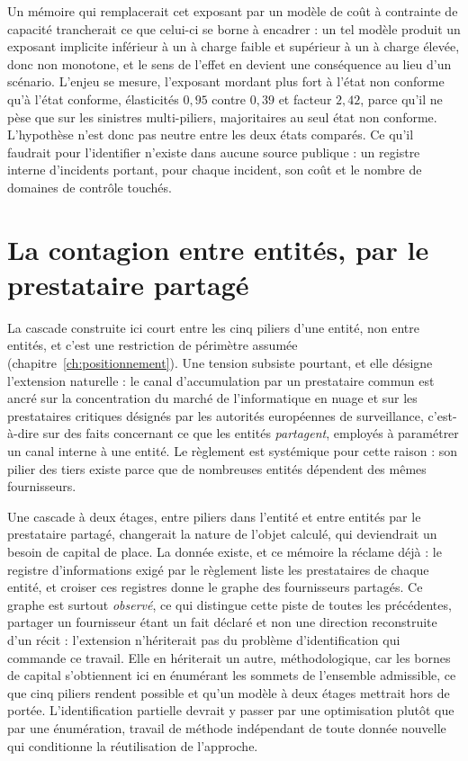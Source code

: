 Un mémoire qui remplacerait cet exposant par un modèle de coût à contrainte de capacité
trancherait ce que celui-ci se borne à encadrer : un tel modèle produit un exposant implicite
inférieur à un à charge faible et supérieur à un à charge élevée, donc non monotone, et le sens de
l'effet en devient une conséquence au lieu d'un scénario. L'enjeu se mesure, l'exposant mordant
plus fort à l'état non conforme qu'à l'état conforme, élasticités $0{,}95$ contre $0{,}39$ et
facteur $2{,}42$, parce qu'il ne pèse que sur les sinistres multi-piliers, majoritaires au seul état
non conforme. L'hypothèse n'est donc pas neutre entre les deux états comparés. Ce qu'il faudrait
pour l'identifier n'existe dans aucune source publique : un registre interne d'incidents portant,
pour chaque incident, son coût et le nombre de domaines de contrôle touchés.


\section{La contagion entre entités, par le prestataire partagé}

La cascade construite ici court entre les cinq piliers d'une entité, non entre entités, et c'est
une restriction de périmètre assumée (chapitre~\ref{ch:positionnement}). Une tension subsiste
pourtant, et elle désigne l'extension naturelle : le canal d'accumulation par un prestataire commun
est ancré sur la concentration du marché de l'informatique en nuage et sur les prestataires
critiques désignés par les autorités européennes de surveillance, c'est-à-dire sur des faits
concernant ce que les entités \emph{partagent}, employés à paramétrer un canal interne à une
entité. Le règlement est systémique pour cette raison : son pilier des tiers existe parce que de
nombreuses entités dépendent des mêmes fournisseurs.

Une cascade à deux étages, entre piliers dans l'entité et entre entités par le prestataire partagé,
changerait la nature de l'objet calculé, qui deviendrait un besoin de capital de place. La donnée
existe, et ce mémoire la réclame déjà : le registre d'informations exigé par le règlement liste les
prestataires de chaque entité, et croiser ces registres donne le graphe des fournisseurs partagés.
Ce graphe est surtout \emph{observé}, ce qui distingue cette piste de toutes les précédentes,
partager un fournisseur étant un fait déclaré et non une direction reconstruite d'un récit :
l'extension n'hériterait pas du problème d'identification qui commande ce travail. Elle en
hériterait un autre, méthodologique, car les bornes de capital s'obtiennent ici en énumérant les
sommets de l'ensemble admissible, ce que cinq piliers rendent possible et qu'un modèle à deux
étages mettrait hors de portée. L'identification partielle devrait y passer par une optimisation
plutôt que par une énumération, travail de méthode indépendant de toute donnée nouvelle qui
conditionne la réutilisation de l'approche.

